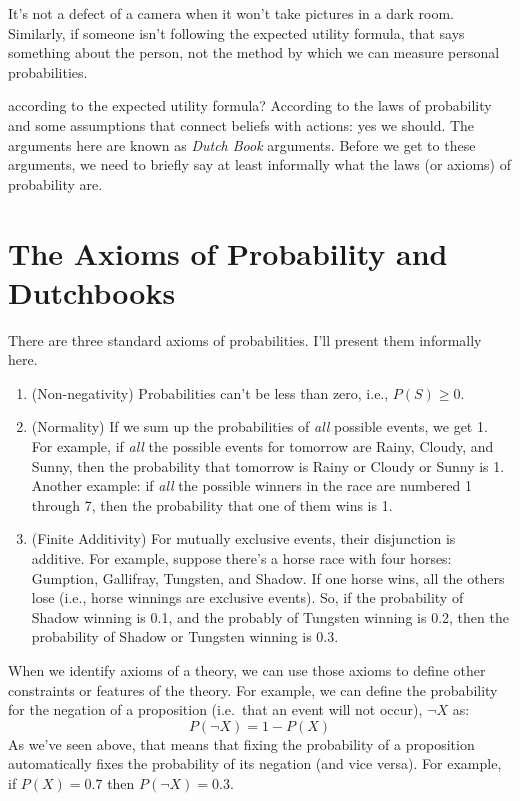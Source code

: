 \documentclass[]{tufte-book}
\begin{document}
 It's not a defect of a camera when it won't take pictures in a dark room. Similarly, if someone isn't following the expected utility formula, that says something about the person, not the method by which we can measure personal probabilities.

 according to the expected utility formula? According to the laws of probability and some assumptions that connect beliefs with actions: yes we should. The arguments here are known as \emph{Dutch Book} arguments. Before we get to these arguments, we need to briefly say at least informally what the laws (or axioms) of probability are.

\hypertarget{the-axioms-of-probability-and-dutchbooks}{%
\section{The Axioms of Probability and Dutchbooks}\label{the-axioms-of-probability-and-dutchbooks}}

There are three standard axioms of probabilities. I'll present them informally here.

\begin{enumerate}
\def\labelenumi{\arabic{enumi}.}
\item
  (Non-negativity) Probabilities can't be less than zero, i.e., \(P(S)\geq 0\).
\item
  (Normality) If we sum up the probabilities of \emph{all} possible events, we get 1. For example, if \emph{all} the possible events for tomorrow are Rainy, Cloudy, and Sunny, then the probability that tomorrow is Rainy or Cloudy or Sunny is 1. Another example: if \emph{all} the possible winners in the race are numbered 1 through 7, then the probability that one of them wins is 1.
\item
  (Finite Additivity) For mutually exclusive events, their disjunction is additive. For example, suppose there's a horse race with four horses: Gumption, Gallifray, Tungsten, and Shadow. If one horse wins, all the others lose (i.e., horse winnings are exclusive events). So, if the probability of Shadow winning is 0.1, and the probably of Tungsten winning is 0.2, then the probability of Shadow or Tungsten winning is 0.3.
\end{enumerate}

When we identify axioms of a theory, we can use those axioms to define other constraints or features of the theory. For example, we can define the probability for the negation of a proposition (i.e.~that an event will not occur), \(\neg X\) as:
\[
P(\neg X) = 1 - P(X)
\]
As we've seen above, that means that fixing the probability of a proposition automatically fixes the probability of its negation (and vice versa). For example, if \(P(X)=0.7\) then \(P(\neg X)=0.3\).
\end{document}
